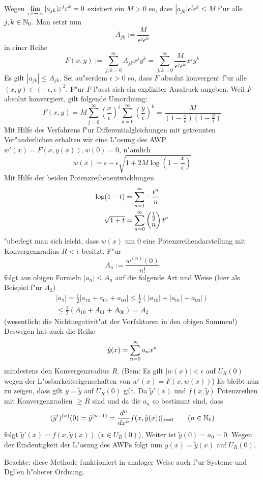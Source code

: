 {  Wegen $\limes {j,k}->\infty |a_{jk}|\epsilon^j\epsilon^k=0$ existiert
  ein $M>0$ so, dass $|a_{jk}|\epsilon^j\epsilon^k\leq M$ f"ur alle
  $j,k\in\mathbb N_0$. Man setzt nun
  \[A_{jk}:=\frac M {\epsilon^j\epsilon^k}
    \]
  in einer Reihe 
  \[F(x,y):=\sum_{j,k=0}^\infty A_{jk} x^jy^k
    =\sum_{j,k=0}^\infty \frac M {\epsilon^j\epsilon^k} x^jy^k
    \] 
  Es gilt $|a_{jk}|\leq A_{jk}$. Sei au"serdem $\epsilon>0$ so, 
  dass $F$ absolut konvergent f"ur alle $(x,y)\in(-\epsilon,\epsilon)^2$. 
  F"ur $F$ l"asst sich ein expliziter Ausdruck angeben. Weil $F$ absolut
  konvergiert, gilt folgende Umordnung:
  \[F(x,y)=M \sum_{j=0}^\infty \left(\frac x \epsilon\right)^j\sum_{k=0}^\infty \left(\frac y \epsilon\right)^k
    =\frac M {\left(1-\frac x \epsilon\right)\left(1-\frac y \epsilon\right)}
    \]
  Mit Hilfe des Verfahrens f"ur Differentialgleichungen mit getrennten 
  Ver"anderlichen erhalten wir eine L"osung des AWP
  $w'(x)=F(x,y(x)),w(0)=0$, n"amlich
  \[w(x)=\epsilon-\epsilon\sqrt{1+2M\log\left(1-\frac x \epsilon\right)}
    \]
  Mit Hilfe der beiden Potenzreihenentwicklungen
  \begin{align*}
    \log(1-t)&=\sumn 1 -\frac {t^n}n\\
    \sqrt{1+t}&=\sumn 0 \combover{\frac 1 2}n t^n
    \end{align*}
  "uberlegt man sich leicht, dass $w(x)$ um $0$ eine Potenzreihendarstellung 
  mit Konvergenzradius $R<\epsilon$ besitzt. F"ur 
  \[A_n:=\frac{w^{(n)}(0)}{n!}
    \]
  folgt aus obigen Formeln $|a_n|\leq A_n$ auf die folgende Art und Weise 
  (hier als Beispiel f"ur $A_2$)
  \begin{multline*}
    |a_2|=\frac 1 2|a_{10}+a_{01}+a_{00}|
    \leq \frac 1 2 (|a_10|+|a_{01}|+a_{00}|)\\
    \leq \frac 1 2 (A_{10}+A_{01}+A_{00})
    = A_2
    \end{multline*}
  (wesentlich: die Nichtnegativit"at der Vorfaktoren in den obigen Summen!)
  Deswegen hat auch die Reihe
  \[\tilde y(x)=\sumn 0 a_n x^n
    \]
  mindestens den Konvergenzradius $R$. 
  (Bem: Es gilt $|w(x)|<\epsilon$ auf $U_R(0)$ wegen der 
  L"osbarkeitseigenschaften von $w'(x)=F(x,w(x))$)
  Es bleibt nun zu zeigen, dass gilt $y=\tilde y$ auf $U_R(0)$ gilt.
  Da $\tilde y'(x)$ und $f(x,\tilde y)$ Potenzreihen mit Konvergenzradien
  $\geq R$ sind und da die $a_n$ so bestimmt sind, dass
  \[(\tilde y')^{(n)}(0)=\tilde y^{(n+1)}=\frac {d^n}{dx^n} f(x,\tilde y(x))|_{x=0}
    \qquad (n\in\mathbb N_0)
    \]
  folgt $\tilde y'(x)=f(x,\tilde y(x))$ ($x\in U_R(0)$), Weiter ist 
  $\tilde y(0)=a_0=0$. Wegen der Eindeutigkeit der L"osung des AWPs folgt
  nun $y(x)=\tilde y(x)$ auf $U_R(0)$.
  
  Beachte: diese Methode funktioniert in analoger Weise auch f"ur
  Systeme und Dgl'en h"oherer Ordnung.
  }
